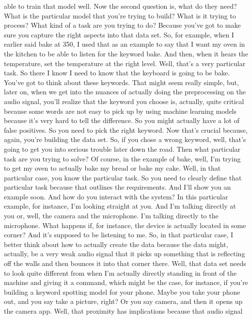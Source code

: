 able to train that model well.
Now the second question is, what do they need?
What is the particular model that you're trying to build?
What is it trying to process?
What kind of a task are you trying to do?
Because you've got to make sure you capture
the right aspects into that data set.
So, for example, when I earlier said bake at 350,
I used that as an example to say that I want my oven in the kitchen to be
able to listen for the keyword bake.
And then, when it hears the temperature, set the temperature at the right level.
Well, that's a very particular task.
So there I know I need to know that the keyboard is going to be bake.
You've got to think about these keywords.
That might seem really simple, but, later on,
when we get into the nuances of actually doing
the preprocessing on the audio signal, you'll
realize that the keyword you choose is, actually, quite critical
because some words are not easy to pick up by using machine learning models
because it's very hard to tell the difference.
So you might actually have a lot of false positives.
So you need to pick the right keyword.
Now that's crucial because, again, you're building the data set.
So, if you chose a wrong keyword, well, that's
going to get you into serious trouble later down the road.
Then what particular task are you trying to solve?
Of course, in the example of bake, well, I'm
trying to get my oven to actually bake my bread or bake my cake.
Well, in that particular case, you know the particular task.
So you need to clearly define that particular task
because that outlines the requirements.
And I'll show you an example soon.
And how do you interact with the system?
In this particular example, for instance, I'm looking straight at you.
And I'm talking directly at you or, well, the camera and the microphone.
I'm talking directly to the microphone.
What happens if, for instance, the device is actually
located in some corner?
And it's supposed to be listening to me.
So, in that particular case, I better think
about how to actually create the data because the data might, actually,
be a very weak audio signal that it picks up
something that is reflecting off the walls
and then bounces it into that corner there.
Well, that data set needs to look quite different from when I'm actually
directly standing in front of the machine
and giving it a command, which might be the case,
for instance, if you're building a keyword spotting model for your phone.
Maybe you take your phone out, and you say take a picture, right?
Or you say camera, and then it opens up the camera app.
Well, that proximity has implications because that audio signal

